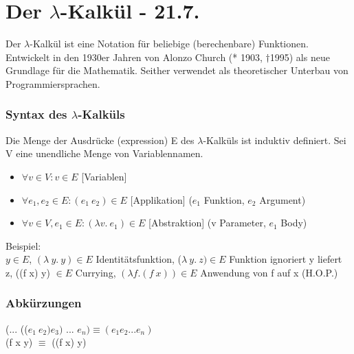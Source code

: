 \documentclass[a4paper, 20pt, openany]{book}
\begin{document}
 \chapter{Der $\lambda$-Kalkül - 21.7.}
Der $\lambda$-Kalkül ist eine Notation für beliebige (berechenbare) Funktionen. Entwickelt in den 1930er Jahren von Alonzo Church (* 1903, $\dagger$1995) als neue Grundlage für die Mathematik. Seither verwendet als theoretischer Unterbau von Programmiersprachen.\\
\subsection{Syntax des $\lambda$-Kalküls}
Die Menge der Ausdrücke (expression) E des $\lambda$-Kalküls ist induktiv definiert. Sei V eine unendliche Menge von Variablennamen.
\begin{itemize}
\item $\forall v \in V: v\in E$ [Variablen]
\item $\forall e_1,e_2 \in E: (e_1\ e_2) \in E$ [Applikation] ($e_1$ Funktion, $e_2$ Argument)
\item $\forall v \in V, e_1 \in E: (\lambda v.\ e_1)\in E$ [Abstraktion] (v Parameter, $e_1$ Body)\\
\end{itemize}
Beispiel:\\
$y \in E$, $(\lambda \ y . \ y) \in E$ Identitätsfunktion, ($\lambda \ y.\ z)\in E$ Funktion ignoriert y liefert z, ((f x) y) $\in E$ Currying, $(\lambda f . (f\ x)) \in E$ Anwendung von f auf x (H.O.P.)\\
\subsection{Abkürzungen}
(... (($e_1 \ e_2) e_3)$ ... $e_n) \equiv (e_1 e_2 ... e_n)$\\
(f x y) $\equiv$ ((f x) y)
\end{document}
